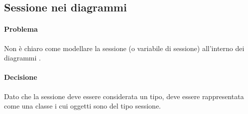 \subsection{Sessione nei diagrammi}
\paragraph{Problema}
Non è chiaro come modellare la sessione (o variabile di sessione) all'interno dei diagrammi .
\paragraph{Decisione}
Dato che la sessione deve essere considerata un tipo, deve essere rappresentata come una classe i cui oggetti sono del tipo sessione.
